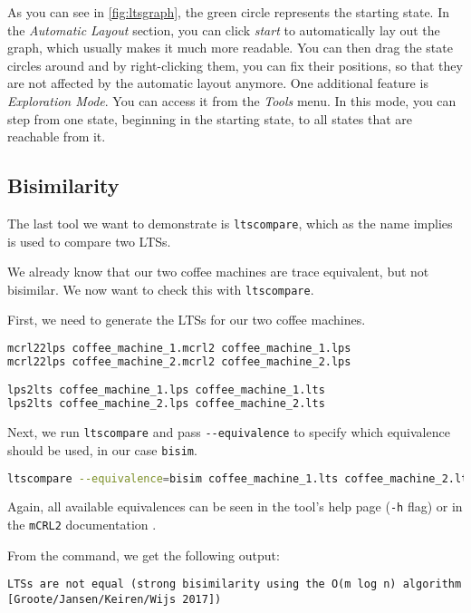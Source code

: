 \documentclass{clseminar}
\begin{document}
  As you can see in \autoref{fig:ltsgraph}, the green circle represents the starting state. In the \textit{Automatic Layout} section, you can click \textit{start} to automatically lay out the graph, which usually makes it much more readable. You can then drag the state circles around and by right-clicking them, you can fix their positions, so that they are not affected by the automatic layout anymore. One additional feature is \textit{Exploration Mode}. You can access it from the \textit{Tools} menu. In this mode, you can step from one state, beginning in the starting state, to all states that are reachable from it.

  \subsection{Bisimilarity}

  The last tool we want to demonstrate is \texttt{ltscompare}, which as the name implies is used to compare two LTSs.

  We already know that our two coffee machines are trace equivalent, but not bisimilar. We now want to check this with \texttt{ltscompare}.

  First, we need to generate the LTSs for our two coffee machines.

  \begin{lstlisting}[language=Bash]
mcrl22lps coffee_machine_1.mcrl2 coffee_machine_1.lps
mcrl22lps coffee_machine_2.mcrl2 coffee_machine_2.lps

lps2lts coffee_machine_1.lps coffee_machine_1.lts
lps2lts coffee_machine_2.lps coffee_machine_2.lts
  \end{lstlisting}

  Next, we run \texttt{ltscompare} and pass \texttt{-{}-equivalence} to specify which equivalence should be used, in our case \texttt{bisim}.

  \begin{lstlisting}[language=Bash]
ltscompare --equivalence=bisim coffee_machine_1.lts coffee_machine_2.lts
  \end{lstlisting}

  Again, all available equivalences can be seen in the tool's help page (\texttt{-h} flag) or in the \texttt{mCRL2} documentation \cite{mcrl2doc}.

  From the command, we get the following output:

  \begin{lstlisting}
LTSs are not equal (strong bisimilarity using the O(m log n) algorithm [Groote/Jansen/Keiren/Wijs 2017])
  \end{lstlisting}
\end{document}
